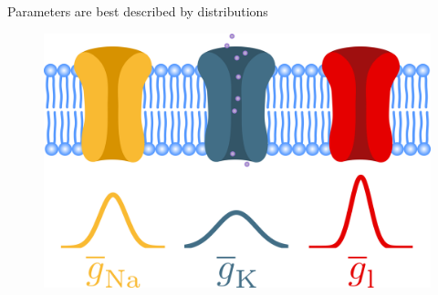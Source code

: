 \documentclass[presentation]{beamer}
\begin{document}




\begin{frame}{Parameters are best described by distributions}
  \begin{figure}
    \includegraphics[width=1\textwidth]{distribution_channels.png}
  \end{figure}

\end{frame}












\end{document}
